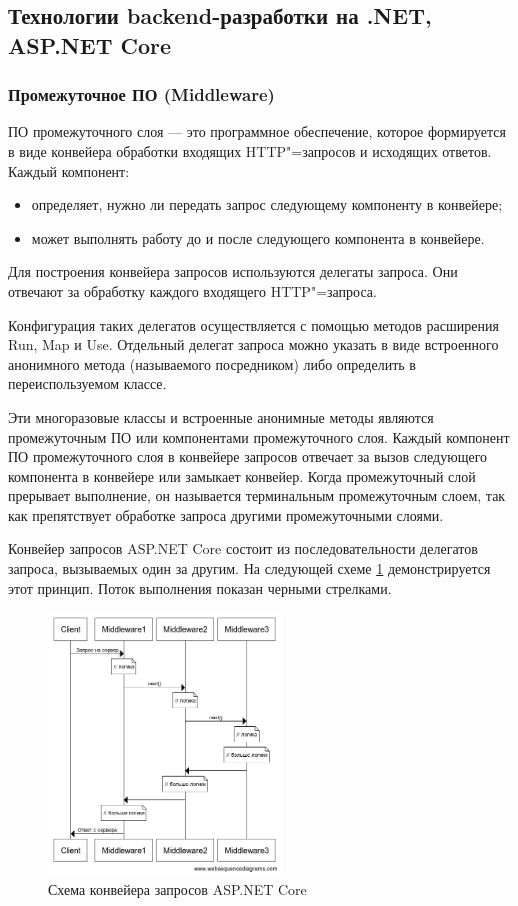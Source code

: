 \subsection{Технологии backend-разработки на .NET, ASP.NET Core}

\subsubsection{Промежуточное ПО (Middleware)}
ПО промежуточного слоя --- это программное обеспечение, которое формируется в виде конвейера обработки входящих HTTP"=запросов и исходящих ответов. Каждый компонент: \cite{Middleware}

\begin{itemize}
	\item{определяет, нужно ли передать запрос следующему компоненту в конвейере;}
	\item{может выполнять работу до и после следующего компонента в конвейере.}
\end{itemize}


Для построения конвейера запросов используются делегаты запроса. Они отвечают за обработку каждого входящего HTTP"=запроса.

Конфигурация таких делегатов осуществляется с помощью методов расширения Run, Map и Use. Отдельный делегат запроса можно указать в виде встроенного анонимного метода (называемого посредником) либо определить в переиспользуемом классе.

Эти многоразовые классы и встроенные анонимные методы являются промежуточным ПО или компонентами промежуточного слоя. Каждый компонент ПО промежуточного слоя в конвейере запросов отвечает за вызов следующего компонента в конвейере или замыкает конвейер. Когда промежуточный слой прерывает выполнение, он называется терминальным промежуточным слоем, так как препятствует обработке запроса другими промежуточными слоями.

Конвейер запросов ASP.NET Core состоит из последовательности делегатов запроса, вызываемых один за другим. На следующей схеме \ref{fig:Middleware} демонстрируется этот принцип. Поток выполнения показан черными стрелками.

\begin{figure}[!h]
    \centering
    \includegraphics[width = 0.55\textwidth]{imgs/middleware.png}
    \caption{Схема конвейера запросов ASP.NET Core}
    \label{fig:Middleware}
\end{figure}

